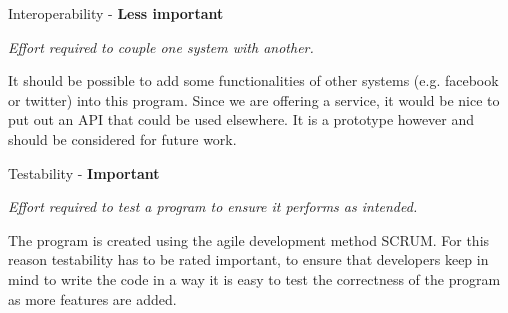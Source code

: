 \vspace{5 mm}
\noindent
Interoperability - \textbf{Less important}

\vspace{5 mm}
\noindent
\textit{Effort required to couple one system with another.}

\vspace{5 mm}
\noindent
It should be possible to add some functionalities of other systems (e.g. facebook or twitter) into this program. Since we are offering a service, it would be nice to put out an API that could be used elsewhere. It is a prototype however and should be considered for future work.

\vspace{5 mm}
\noindent
Testability - \textbf{Important}

\vspace{5 mm}
\noindent
\textit{Effort required to test a program to ensure it performs as intended.}

\vspace{5 mm}
\noindent
The program is created using the agile development method SCRUM. For this reason testability has to be rated important, to ensure that developers keep in mind to write the code in a way it is easy to test the correctness of the program as more features are added.